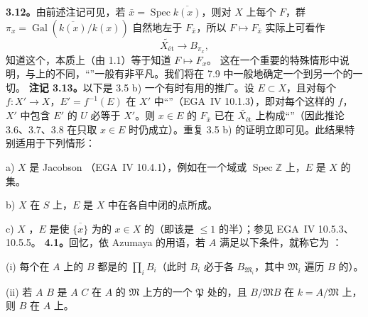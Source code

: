 \textbf{3.12。}由前述注记可见，若 $\bar x=\operatorname{Spec}\overline{k(x)}$，则对 $X$ 上每个 $F$，群 $\pi_x=\operatorname{Gal}(\overline{k(x)}/k(x))$ 自然地左于 $F_{\bar x}$，所以 $F\mapsto F_{\bar x}$ 实际上可看作
\[\widetilde{X_{\text{ét}}}\longrightarrow B_{\pi_x},\]
知道这个，本质上（由 1.1）等于知道 $F\mapsto F_x$。
这在一个重要的特殊情形中说明，与上的不同，“”一般有非平凡。我们将在 7.9 中一般地确定一个到另一个的一切。
\textbf{注记 3.13。}以下是 3.5 b) 一个有时有用的推广。设 $E\subset X$，且对每个 $f:X'\to X$，$E'=f^{-1}(E)$ 在 $X'$ 中“”（EGA~IV 10.1.3），即对每个这样的 $f$，$X'$ 中包含 $E'$ 的 $U$ 必等于 $X'$。则 $x\in E$ 的 $F_{\bar x}$ 已在 $\widetilde{X_{\text{ét}}}$ 上构成“”（因此推论 3.6、3.7、3.8 在只取 $x\in E$ 时仍成立）。重复 3.5 b) 的证明立即可见。此结果特别适用于下列情形：
\par a) $X$ 是 Jacobson （EGA~IV 10.4.1），例如在一个域或 $\operatorname{Spec}\mathbb Z$ 上，$E$ 是 $X$ 的集。
\par b) $X$ 在 $S$ 上，$E$ 是 $X$ 中在各自中闭的点所成。
\par c) $X$ ，$E$ 是使 $\overline{\{x\}}$ 为的 $x\in X$ 的（即该是 $\leq1$ 的半）；参见 EGA~IV 10.5.3、10.5.5。
\textbf{4.1。}回忆，依 Azumaya 的用语，若 $A$ 满足以下条件，就称它为 ：
\par (i) 每个在 $A$ 上的 $B$ 都是的 $\prod_iB_i$（此时 $B_i$ 必于各 $B_{\mathfrak M_i}$，其中 $\mathfrak M_i$ 遍历 $B$ 的）。
\par (ii) 若 $A$  $B$ 是 $A$  $C$ 在 $A$ 的 $\mathfrak M$ 上方的一个 $\mathfrak P$ 处的，且 $B/\mathfrak MB$ 在 $k=A/\mathfrak M$ 上，则 $B$ 在 $A$ 上。
